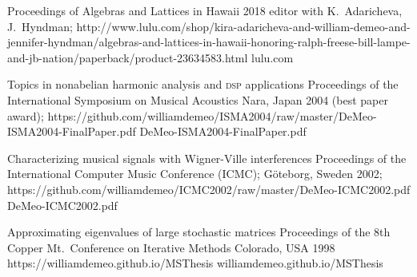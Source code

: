 \begin{enumerate}
  \setcounter{enumi}{4}
\pubitem 
{Proceedings of Algebras and Lattices in Hawaii 2018}
{editor with K.~Adaricheva, J.~Hyndman;}
{}
{}{http://www.lulu.com/shop/kira-adaricheva-and-william-demeo-and-jennifer-hyndman/algebras-and-lattices-in-hawaii-honoring-ralph-freese-bill-lampe-and-jb-nation/paperback/product-23634583.html}
{lulu.com}

\pubitem
{Topics in nonabelian harmonic analysis and \textsc{dsp}  applications}
{}
{Proceedings of the International Symposium on Musical Acoustics}
{Nara, Japan 2004 (best paper award);}
{https://github.com/williamdemeo/ISMA2004/raw/master/DeMeo-ISMA2004-FinalPaper.pdf}
{DeMeo-ISMA2004-FinalPaper.pdf}

\pubitem
{Characterizing musical signals with Wigner-Ville interferences}
{}
{Proceedings of the International Computer Music Conference {\small (ICMC)};}
{G\"{o}teborg, Sweden 2002;}
{https://github.com/williamdemeo/ICMC2002/raw/master/DeMeo-ICMC2002.pdf}
{DeMeo-ICMC2002.pdf}

\pubitem      
{Approximating eigenvalues of large stochastic matrices}
{}
{Proceedings of the 8th Copper Mt.~Conference on Iterative Methods}
{Colorado, USA 1998}
{https://williamdemeo.github.io/MSThesis}
{williamdemeo.github.io/MSThesis}
      
\end{enumerate}

